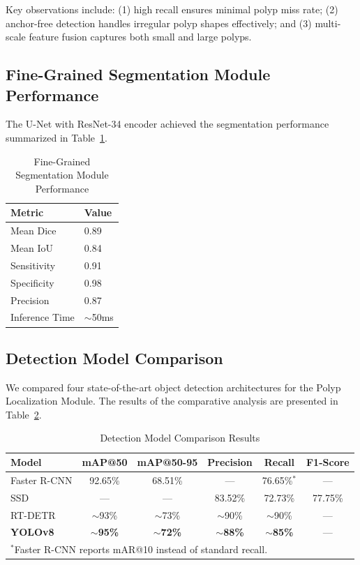\documentclass[conference]{IEEEtran}
\begin{document}
Key observations include: (1) high recall ensures minimal polyp miss rate; (2) anchor-free detection handles irregular polyp shapes effectively; and (3) multi-scale feature fusion captures both small and large polyps.

\subsection{Fine-Grained Segmentation Module Performance}

The U-Net with ResNet-34 encoder achieved the segmentation performance summarized in Table~\ref{tab:fsm_results}.

\begin{table}[htbp]
\caption{Fine-Grained Segmentation Module Performance}
\label{tab:fsm_results}
\centering
\begin{tabular}{ll}
\toprule
\textbf{Metric} & \textbf{Value} \\
\midrule
Mean Dice & 0.89 \\
Mean IoU & 0.84 \\
Sensitivity & 0.91 \\
Specificity & 0.98 \\
Precision & 0.87 \\
Inference Time & $\sim$50ms \\
\bottomrule
\end{tabular}
\end{table}

\subsection{Detection Model Comparison}

We compared four state-of-the-art object detection architectures for the Polyp Localization Module. The results of the comparative analysis are presented in Table~\ref{tab:comparison}.

\begin{table}[htbp]
\caption{Detection Model Comparison Results}
\label{tab:comparison}
\centering
\begin{tabular}{lccccc}
\toprule
\textbf{Model} & \textbf{mAP@50} & \textbf{mAP@50-95} & \textbf{Precision} & \textbf{Recall} & \textbf{F1-Score} \\
\midrule
Faster R-CNN & 92.65\% & 68.51\% & --- & 76.65\%$^{*}$ & --- \\
SSD & --- & --- & 83.52\% & 72.73\% & 77.75\% \\
RT-DETR & $\sim$93\% & $\sim$73\% & $\sim$90\% & $\sim$90\% & --- \\
\textbf{YOLOv8} & \textbf{$\sim$95\%} & \textbf{$\sim$72\%} & \textbf{$\sim$88\%} & \textbf{$\sim$85\%} & --- \\
\bottomrule
\multicolumn{6}{l}{\footnotesize $^{*}$Faster R-CNN reports mAR@10 instead of standard recall.}
\end{tabular}
\end{table}
\end{document}
